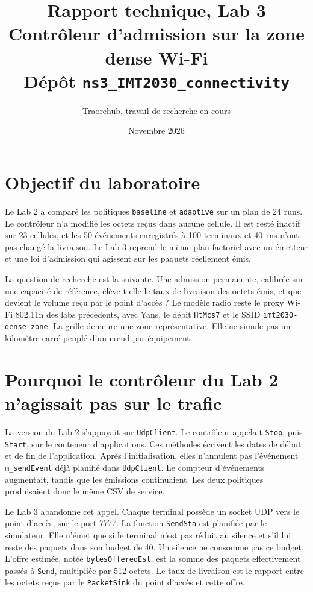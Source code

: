 \documentclass[11pt,a4paper]{article}
\title{Rapport technique, Lab 3\\
\large Contrôleur d'admission sur la zone dense Wi-Fi\\
Dépôt \texttt{ns3\_IMT2030\_connectivity}}
\author{Traorehub, travail de recherche en cours}
\date{Novembre 2026}
\begin{document}
\maketitle
\tableofcontents
\newpage

\section{Objectif du laboratoire}

Le Lab 2 a comparé les politiques \texttt{baseline} et \texttt{adaptive} sur un plan de 24 runs. Le contrôleur n'a modifié les octets reçus dans aucune cellule. Il est resté inactif sur 23 cellules, et les 50 événements enregistrés à 100 terminaux et 40~ms n'ont pas changé la livraison. Le Lab 3 reprend le même plan factoriel avec un émetteur et une loi d'admission qui agissent sur les paquets réellement émis.

La question de recherche est la suivante. Une admission permanente, calibrée sur une capacité de référence, élève-t-elle le taux de livraison des octets émis, et que devient le volume reçu par le point d'accès ? Le modèle radio reste le proxy Wi-Fi 802.11n des labs précédents, avec Yans, le débit \texttt{HtMcs7} et le SSID \texttt{imt2030-dense-zone}. La grille demeure une zone représentative. Elle ne simule pas un kilomètre carré peuplé d'un nœud par équipement.

\section{Pourquoi le contrôleur du Lab 2 n'agissait pas sur le trafic}

La version du Lab 2 s'appuyait sur \texttt{UdpClient}. Le contrôleur appelait \texttt{Stop}, puis \texttt{Start}, sur le conteneur d'applications. Ces méthodes écrivent les dates de début et de fin de l'application. Après l'initialisation, elles n'annulent pas l'événement \texttt{m\_sendEvent} déjà planifié dans \texttt{UdpClient}. Le compteur d'événements augmentait, tandis que les émissions continuaient. Les deux politiques produisaient donc le même CSV de service.

Le Lab 3 abandonne cet appel. Chaque terminal possède un socket UDP vers le point d'accès, sur le port 7777. La fonction \texttt{SendSta} est planifiée par le simulateur. Elle n'émet que si le terminal n'est pas réduit au silence et s'il lui reste des paquets dans son budget de 40. Un silence ne consomme pas ce budget. L'offre estimée, notée \texttt{bytesOfferedEst}, est la somme des paquets effectivement passés à \texttt{Send}, multipliée par 512 octets. Le taux de livraison est le rapport entre les octets reçus par le \texttt{PacketSink} du point d'accès et cette offre.
\end{document}
